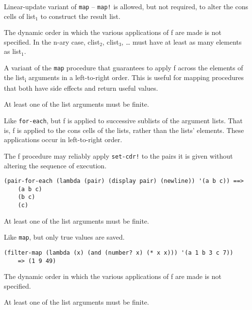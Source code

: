 \begin{entry}{%
  }

  Linear-update variant of \texttt{map} -- \texttt{map!} is
  allowed, but not required, to alter the cons cells of list$_1$ to
  construct the result list.

  The dynamic order in which the various applications of f are made is
  not specified. In the n-ary case, clist$_2$, clist$_3$, \ldots{}
  must have at least as many elements as list$_1$.
\end{entry}

\begin{entry}{%
  }

  A variant of the \texttt{map} procedure that
  guarantees to apply f across the elements of the
  list\textsubscript{i} arguments in a left-to-right order. This is
  useful for mapping procedures that both have side effects and return
  useful values.

  At least one of the list arguments must be finite.
\end{entry}

\begin{entry}{%
  }


  Like \texttt{for-each}, but f is
  applied to successive sublists of the argument lists. That is, f is
  applied to the cons cells of the lists, rather than the lists'
  elements. These applications occur in left-to-right order.

  The f procedure may reliably apply \texttt{set-cdr!} to the pairs it
  is given without altering the sequence of execution.

\begin{verbatim}
(pair-for-each (lambda (pair) (display pair) (newline)) '(a b c)) ==>
    (a b c)
    (b c)
    (c)
\end{verbatim}

  At least one of the list arguments must be finite.
\end{entry}

\begin{entry}{%
  }

  Like \texttt{map}, but only true values are
  saved.

\begin{verbatim}
(filter-map (lambda (x) (and (number? x) (* x x))) '(a 1 b 3 c 7))
    => (1 9 49)
\end{verbatim}

  The dynamic order in which the various applications of f are made is
  not specified.

  At least one of the list arguments must be finite.
\end{entry}

